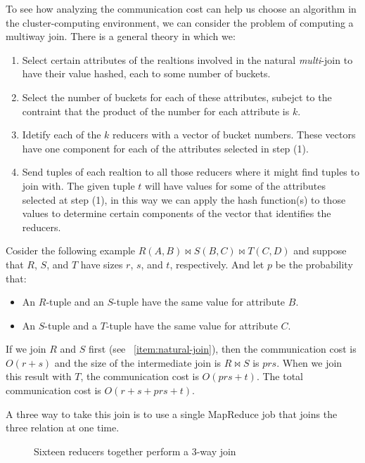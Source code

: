 To see how analyzing the communication cost can help us choose an algorithm in the cluster-computing environment, we can consider the problem of computing a multiway join. There is a general theory in which we:
\begin{enumerate}
    \item Select certain attributes of the realtions involved in the natural \textit{multi}-join to have their value hashed, each to some number of buckets.
    \item Select the number of buckets for each of these attributes, subejct to the contraint that the product of the number for each attribute is $k$.
    \item Idetify each of the $k$ reducers with a vector of bucket numbers. These vectors have one component for each of the attributes selected in step (1).
    \item Send tuples of each realtion to all those reducers where it might find tuples to join with. The given tuple $t$ will have values for some of the attributes selected at step (1), in this way we can apply the hash function(s) to those values to determine certain components of the vector that identifies the reducers. 
\end{enumerate}
Cosider the following example $R(A, B) \bowtie S(B, C) \bowtie T(C, D)$ and suppose that $R$, $S$, and $T$ have sizes $r$, $s$, and $t$, respectively. And let $p$ be the probability that:
\begin{itemize}
    \item An $R$-tuple and an $S$-tuple have the same value for attribute $B$.
    \item An $S$-tuple and a $T$-tuple have the same value for attribute $C$.
\end{itemize}
If we join $R$ and $S$ first (see ~\ref{item:natural-join}), then the communication cost is $O(r+s)$ and the size of the intermediate join is $R \bowtie S$ is $prs$. When we join this result with $T$, the communication cost is $O(prs+t)$. The total communication cost is $O(r+s+prs+t)$. 

A three way to take this join is to use a single MapReduce job that joins the three relation at one time. 

\begin{figure}[H]
\centering
\scalebox{1}{
    
}
\caption{Sixteen reducers together perform a 3-way join}
\label{fig:3-way-join}
\end{figure}

